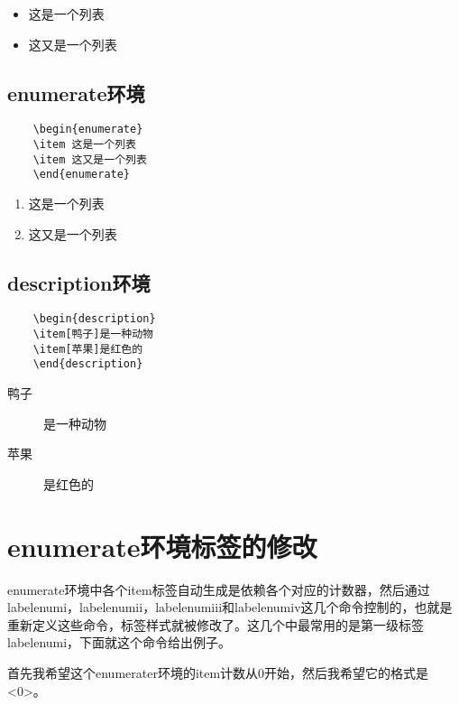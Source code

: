 \documentclass[11pt,oneside]{book}
\begin{document}
  \begin{itemize}
  \item 这是一个列表
  \item 这又是一个列表
  \end{itemize}



  \subsection{enumerate环境}
  \begin{Verbatim}
    \begin{enumerate}
    \item 这是一个列表
    \item 这又是一个列表
    \end{enumerate}
  \end{Verbatim}

  \begin{enumerate}
  \item 这是一个列表
  \item 这又是一个列表
  \end{enumerate}

  \subsection{description环境}
  \begin{Verbatim}
    \begin{description}
    \item[鸭子]是一种动物
    \item[苹果]是红色的
    \end{description}
  \end{Verbatim}
  \begin{description}
  \item[鸭子]是一种动物
  \item[苹果]是红色的
  \end{description}

  \section{enumerate环境标签的修改}
  \label{sec:enumerate环境标签的修改}
  enumerate环境中各个item标签自动生成是依赖各个对应的计数器，然后通过labelenumi，labelenumii，labelenumiii和labelenumiv这几个命令控制的，也就是重新定义这些命令，标签样式就被修改了。这几个中最常用的是第一级标签labelenumi，下面就这个命令给出例子。

  首先我希望这个enumerater环境的item计数从0开始，然后我希望它的格式是<0>。
\end{document}

